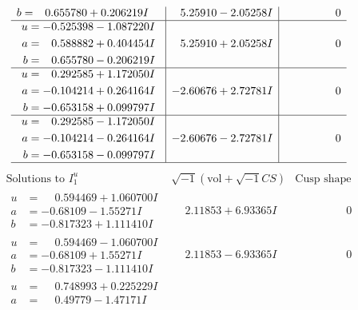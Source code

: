 \documentclass[1p]{elsarticle_modified}
\theoremstyle{definition}
\newcommand{\I}{\sqrt{-1}}
\begin{document}
$$\begin{array}{c|c|c}
\begin{aligned}
b &= \phantom{-}0.655780 + 0.206219 I\end{aligned}
 & \phantom{-}5.25910 - 2.05258 I & \phantom{-0.000000 } 0 \\ \hline\begin{aligned}
u &= -0.525398 - 1.087220 I \\
a &= \phantom{-}0.588882 + 0.404454 I \\
b &= \phantom{-}0.655780 - 0.206219 I\end{aligned}
 & \phantom{-}5.25910 + 2.05258 I & \phantom{-0.000000 } 0 \\ \hline\begin{aligned}
u &= \phantom{-}0.292585 + 1.172050 I \\
a &= -0.104214 + 0.264164 I \\
b &= -0.653158 + 0.099797 I\end{aligned}
 & -2.60676 + 2.72781 I & \phantom{-0.000000 } 0 \\ \hline\begin{aligned}
u &= \phantom{-}0.292585 - 1.172050 I \\
a &= -0.104214 - 0.264164 I \\
b &= -0.653158 - 0.099797 I\end{aligned}
 & -2.60676 - 2.72781 I & \phantom{-0.000000 } 0\\
 \hline 
 \end{array}$$\newpage$$\begin{array}{c|c|c}  
\text{Solutions to }I^u_{1}& \I (\text{vol} + \sqrt{-1}CS) & \text{Cusp shape}\\
 \hline 
\begin{aligned}
u &= \phantom{-}0.594469 + 1.060700 I \\
a &= -0.68109 - 1.55271 I \\
b &= -0.817323 + 1.111410 I\end{aligned}
 & \phantom{-}2.11853 + 6.93365 I & \phantom{-0.000000 } 0 \\ \hline\begin{aligned}
u &= \phantom{-}0.594469 - 1.060700 I \\
a &= -0.68109 + 1.55271 I \\
b &= -0.817323 - 1.111410 I\end{aligned}
 & \phantom{-}2.11853 - 6.93365 I & \phantom{-0.000000 } 0 \\ \hline\begin{aligned}
u &= \phantom{-}0.748993 + 0.225229 I \\
a &= \phantom{-}0.49779 - 1.47171 I \\

\end{aligned}
\end{array}$$
\end{document}
